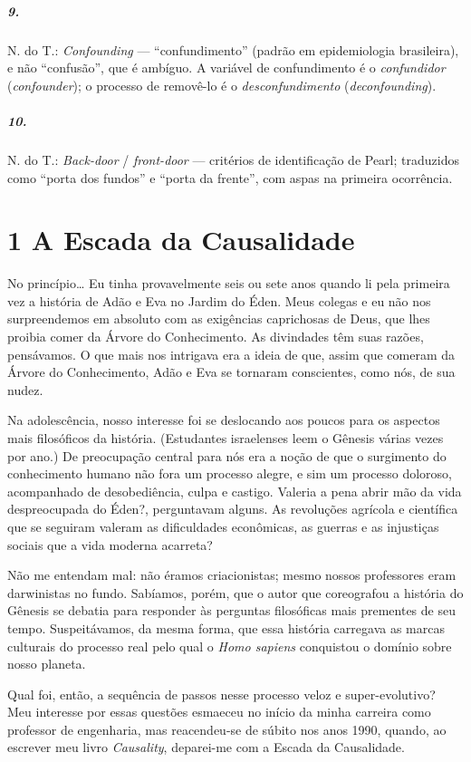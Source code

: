 \documentclass[11pt,a5paper,twoside]{book}
\begin{document}
\paragraph{9.} N. do T.: \textit{Confounding} — “confundimento” (padrão em epidemiologia brasileira), e não “confusão”, que é ambíguo. A variável de confundimento é o \textit{confundidor} (\textit{confounder}); o processo de removê-lo é o \textit{desconfundimento} (\textit{deconfounding}).
\paragraph{10.} N. do T.: \textit{Back-door} / \textit{front-door} — critérios de identificação de Pearl; traduzidos como “porta dos fundos” e “porta da frente”, com aspas na primeira ocorrência.
\chapter{1 A Escada da Causalidade}
No princípio… Eu tinha provavelmente seis ou sete anos quando li pela primeira vez a história de Adão e Eva no Jardim do Éden. Meus colegas e eu não nos surpreendemos em absoluto com as exigências caprichosas de Deus, que lhes proibia comer da Árvore do Conhecimento. As divindades têm suas razões, pensávamos. O que mais nos intrigava era a ideia de que, assim que comeram da Árvore do Conhecimento, Adão e Eva se tornaram conscientes, como nós, de sua nudez.

Na adolescência, nosso interesse foi se deslocando aos poucos para os aspectos mais filosóficos da história. (Estudantes israelenses leem o Gênesis várias vezes por ano.) De preocupação central para nós era a noção de que o surgimento do conhecimento humano não fora um processo alegre, e sim um processo doloroso, acompanhado de desobediência, culpa e castigo. Valeria a pena abrir mão da vida despreocupada do Éden?, perguntavam alguns. As revoluções agrícola e científica que se seguiram valeram as dificuldades econômicas, as guerras e as injustiças sociais que a vida moderna acarreta?

Não me entendam mal: não éramos criacionistas; mesmo nossos professores eram darwinistas no fundo. Sabíamos, porém, que o autor que coreografou a história do Gênesis se debatia para responder às perguntas filosóficas mais prementes de seu tempo. Suspeitávamos, da mesma forma, que essa história carregava as marcas culturais do processo real pelo qual o \textit{Homo sapiens} conquistou o domínio sobre nosso planeta.

Qual foi, então, a sequência de passos nesse processo veloz e super-evolutivo? Meu interesse por essas questões esmaeceu no início da minha carreira como professor de engenharia, mas reacendeu-se de súbito nos anos 1990, quando, ao escrever meu livro \textit{Causality}, deparei-me com a Escada da Causalidade.
\end{document}

